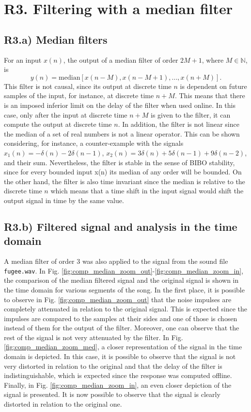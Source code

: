 \documentclass[a4paper, oneside, 11pt]{article}
\begin{document}
\section{R3. Filtering with a median filter}

\subsection{R3.a) Median filters}

For an input $x(n)$, the output of a median filter of order $2 M + 1$, where $M \in \mathbb{N}$, is
\begin{equation}
    y(n) = \mathrm{median} \left [ x(n-M), x(n-M+1), ..., x(n+M) \right ].
\end{equation}
This filter is not causal, since its output at discrete time $n$ is dependent on future samples of the input, for instance, at discrete time $n+M$. This means that there is an imposed inferior limit on the delay of the filter when used online. In this case, only after the input at discrete time $n+M$ is given to the filter, it can compute the output at discrete time $n$. In addition, the filter is not linear since the median of a set of real numbers is not a linear operator. This can be shown considering, for instance, a counter-example with the signals $x_1(n) = - \delta(n) - 2 \delta(n-1)$, $x_2(n) = 3 \delta(n) + 5 \delta(n-1) + 9 \delta(n-2)$, and their sum. Nevertheless, the filter is stable in the sense of BIBO stability, since for every bounded input x(n) its median of any order will be bounded. On the other hand, the filter is also time invariant since the median is relative to the discrete time $n$ which means that a time shift in the input signal would shift the output signal in time by the same value.

\subsection{R3.b) Filtered signal and analysis in the time domain}

A median filter of order 3 was also applied to the signal from the sound file \texttt{fugee.wav}. In Fig. \ref{fig:comp_median_zoom_out}-\ref{fig:comp_median_zoom_in}, the comparison of the median filtered signal and the original signal is shown in the time domain for various segments of the song. In the first place, it is possible to observe in Fig. \ref{fig:comp_median_zoom_out} that the noise impulses are completely attenuated in relation to the original signal. This is expected since the impulses are compared to the samples at their sides and one of those is chosen instead of them for the output of the filter. Moreover, one can observe that the rest of the signal is not very attenuated by the filter. In Fig. \ref{fig:comp_median_zoom_med}, a closer representation of the signal in the time domain is depicted. In this case, it is possible to observe that the signal is not very distorted in relation to the original and that the delay of the filter is indistinguishable, which is expected since the response was computed offline. Finally, in Fig. \ref{fig:comp_median_zoom_in}, an even closer depiction of the signal is presented. It is now possible to observe that the signal is clearly distorted in relation to the original one.
\end{document}
